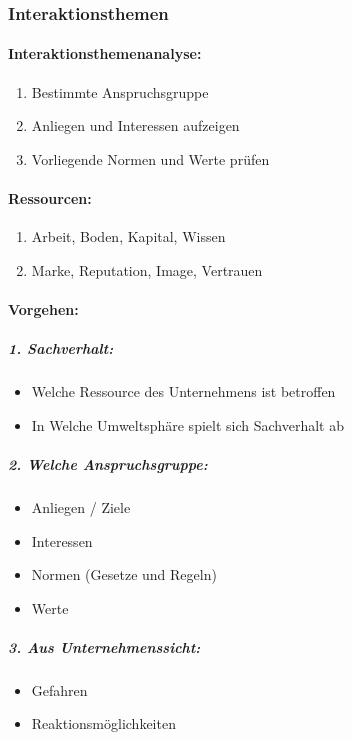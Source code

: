 \documentclass{article}
\begin{document}
\subsubsection{Interaktionsthemen}

\paragraph{Interaktionsthemenanalyse:}
\begin{enumerate}
\item Bestimmte Anspruchsgruppe
\item Anliegen und Interessen aufzeigen
\item Vorliegende Normen und Werte prüfen
\end{enumerate}

\paragraph{Ressourcen:}
\begin{enumerate}
\item Arbeit, Boden, Kapital, Wissen
\item Marke, Reputation, Image, Vertrauen
\end{enumerate}


\paragraph{Vorgehen:}

\subparagraph{1. Sachverhalt:}
\begin{itemize}
\item Welche Ressource des Unternehmens ist betroffen
\item In Welche Umweltsphäre spielt sich Sachverhalt ab
\end{itemize}

\subparagraph{2. Welche Anspruchsgruppe:}
\begin{itemize}
\item Anliegen / Ziele
\item Interessen
\item Normen (Gesetze und Regeln)
\item Werte
\end{itemize}

\subparagraph{3. Aus Unternehmenssicht:}
\begin{itemize}
\item Gefahren
\item Reaktionsmöglichkeiten
\end{itemize}
\end{document}
